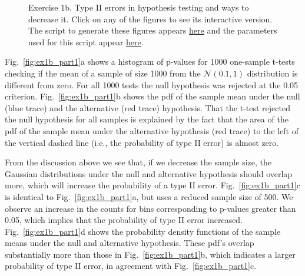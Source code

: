 \documentclass[12pt]{article}
\begin{document}
\begin{enumerate}[(a)]
\begin{figure}[H]
\begin{center}
                \caption{Exercise 1b. Type II errors in hypothesis testing and
                ways to decrease it. Click on any of the figures to see its
                interactive version.  The script to generate these figures
                appears
                \href{https://github.com/joacorapela/neuroinformatics23/blob/master/worksheets/ws1/mySolution/code/scripts/doPlotTwoGaussians.py}{here}
                and the parameters used for this script appear
                \href{https://github.com/joacorapela/neuroinformatics23/blob/master/worksheets/ws1/mySolution/code/scripts/doPlotTwoGaussians.py}{here}.}

                \label{fig:typeIIerror}
            \end{center}
        \end{figure}

        Fig.~\ref{fig:ex1b_part1}a shows a histogram of p-values for 1000
        one-sample t-tests checking if the mean of a sample of size 1000 from
        the $\mathcal{N}(0.1, 1)$ distribution is different from zero.
        For all 1000 tests the null hypothesis was rejected at the 0.05
        criterion.
        Fig.~\ref{fig:ex1b_part1}b shows the pdf of the sample mean under
        the null (blue trace) and the alternative (red trace) hypothesis.  That
        the t-test rejected the null hypothesis for all samples is
        explained by the fact that the area of the pdf of the sample mean under
        the alternative hypothesis (red trace) to the left of the vertical
        dashed line (i.e., the probability of type II error) is almost zero.

        From the discussion above we see that, if we decrease the sample size,
        the Gaussian distributions under the null and alternative hypothesis
        should overlap more, which will increase the probability of a type II
        error. Fig.~\ref{fig:ex1b_part1}c is identical to
        Fig.~\ref{fig:ex1b_part1}a, but uses a reduced sample size of 500.
        We observe an increase in  the counts for bins corresponding to p-values
        greater than 0.05, which implies that the probability of type II error
        increased.  Fig.~\ref{fig:ex1b_part1}d shows the probability
        density functions of the sample means under the null and alternative
        hypothesis. These pdf's overlap substantially more than those in
        Fig.~\ref{fig:ex1b_part1}b, which indicates a larger probability of
        type II error, in agreement with Fig.~\ref{fig:ex1b_part1}c.


\end{enumerate}
\end{document}
